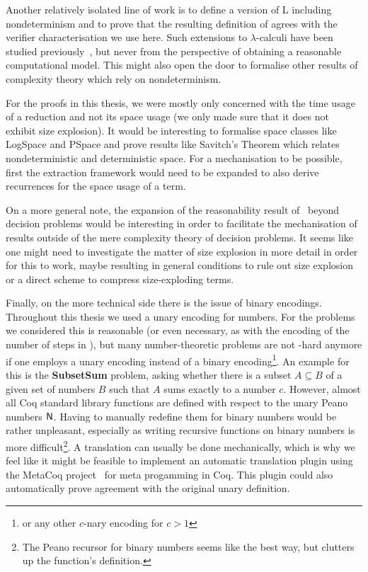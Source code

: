 Another relatively isolated line of work is to define a version of L including nondeterminism and to prove that the resulting definition of \NP{} agrees with the verifier characterisation we use here. Such extensions to $\lambda$-calculi have been studied previously~\cite{kutzner:nondet_lambda}, but never from the perspective of obtaining a reasonable computational model. This might also open the door to formalise other results of complexity theory which rely on nondeterminism.

For the proofs in this thesis, we were mostly only concerned with the time usage of a reduction and not its space usage (we only made sure that it does not exhibit size explosion). It would be interesting to formalise space classes like \textsf{LogSpace} and \textsf{PSpace} and prove results like Savitch's Theorem which relates nondeterministic and deterministic space. For a mechanisation to be possible, first the extraction framework would need to be expanded to also derive recurrences for the space usage of a term.

On a more general note, the expansion of the reasonability result of~\cite{ForsterKunzeRoth:2019:wcbv-Reasonable} beyond decision problems would be interesting in order to facilitate the mechanisation of results outside of the mere complexity theory of decision problems. It seems like one might need to investigate the matter of size explosion in more detail in order for this to work, maybe resulting in general conditions to rule out size explosion or a direct scheme to compress size-exploding terms.

Finally, on the more technical side there is the issue of binary encodings. Throughout this thesis we used a unary encoding for numbers. For the problems we considered this is reasonable (or even necessary, as with the encoding of the number of steps in \gennp{}), but many number-theoretic problems are not \NP{}-hard anymore if one employs a unary encoding instead of a binary encoding\footnote{or any other $c$-nary encoding for $c> 1$}. An example for this is the \textbf{SubsetSum} problem, asking whether there is a subset $A \subseteq B$ of a given set of numbers $B$ such that $A$ sums exactly to a number $c$.
However, almost all Coq standard library functions are defined with respect to the unary Peano numbers $\mathsf{N}$.
Having to manually redefine them for binary numbers would be rather unpleasant, especially as writing recursive functions on binary numbers is more difficult\footnote{The Peano recursor for binary numbers seems like the best way, but clutters up the function's definition.}.
A translation can usually be done mechanically, which is why we feel like it might be feasible to implement an automatic translation plugin using the MetaCoq project~\cite{metacoq_web} for meta progamming in Coq. This plugin could also automatically prove agreement with the original unary definition.

